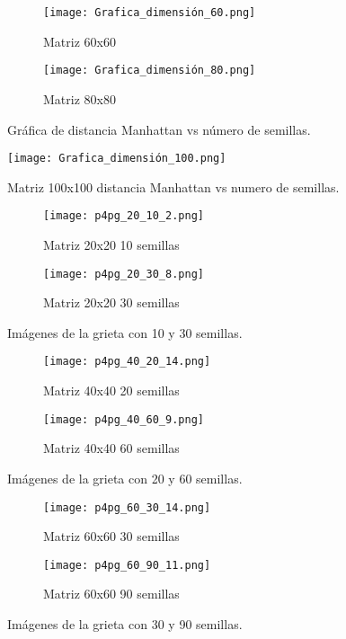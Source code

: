 \documentclass{article}
\begin{document}
\begin{figure}[H]
\centering
\begin{subfigure}[b]{0.45\linewidth}
\texttt{[image: Grafica\_dimensión\_60.png]}
\caption{Matriz 60x60}
\end{subfigure}
\begin{subfigure}[b]{0.45\linewidth}
\texttt{[image: Grafica\_dimensión\_80.png]}
\caption{Matriz 80x80}
\end{subfigure}
\caption{Gráfica de distancia Manhattan vs número de semillas.}
\label{fig:westminster}
\end{figure}

\begin{figure}[H]
\centering
\texttt{[image: Grafica\_dimensión\_100.png]}
\caption{\label{fig3}Matriz 100x100 distancia Manhattan vs numero de semillas.}
\end{figure}

\begin{figure}[H]
\centering
\begin{subfigure}[b]{0.30\linewidth}
\texttt{[image: p4pg\_20\_10\_2.png]}
\caption{Matriz 20x20 10 semillas}
\end{subfigure}
\begin{subfigure}[b]{0.30\linewidth}
\texttt{[image: p4pg\_20\_30\_8.png]}
\caption{Matriz 20x20 30 semillas}
\end{subfigure}
\caption{Imágenes de la grieta con 10 y 30 semillas.}
\label{fig:westminster}
\end{figure}

\begin{figure}[H]
\centering
\begin{subfigure}[b]{0.30\linewidth}
\texttt{[image: p4pg\_40\_20\_14.png]}
\caption{Matriz 40x40 20 semillas}
\end{subfigure}
\begin{subfigure}[b]{0.30\linewidth}
\texttt{[image: p4pg\_40\_60\_9.png]}
\caption{Matriz 40x40 60 semillas}
\end{subfigure}
\caption{Imágenes de la grieta con 20 y 60 semillas.}
\label{fig:westminster}
\end{figure}

\begin{figure}[H]
\centering
\begin{subfigure}[b]{0.30\linewidth}
\texttt{[image: p4pg\_60\_30\_14.png]}
\caption{Matriz 60x60 30 semillas}
\end{subfigure}
\begin{subfigure}[b]{0.30\linewidth}
\texttt{[image: p4pg\_60\_90\_11.png]}
\caption{Matriz 60x60 90 semillas}
\end{subfigure}
\caption{Imágenes de la grieta con 30 y 90 semillas.}
\label{fig:westminster}
\end{figure}
\end{document}
